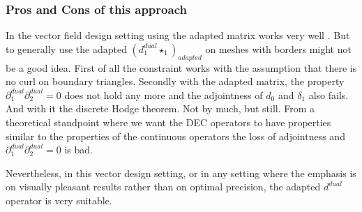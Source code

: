 
\subsubsection{ Pros and Cons of this approach} In the vector field design setting using the adapted matrix works very well . But to generally use the adapted $(d_1^{dual} \star_1)_{adapted}$ on meshes with borders might not be a good idea. First of all the constraint works with the assumption that there is no curl on boundary triangles. Secondly  with the adapted matrix, the property $\partial^{dual}_1\partial^{dual}_2 = 0$ does not hold any more and the adjointness of $d_0$ and $\delta_1$ also fails. And with it the discrete Hodge theorem. Not by much, but still. 
From a theoretical standpoint where we want the DEC operators to have properties similar to the properties of the continuous operators the loss of adjointness and $\partial^{dual}_1\partial^{dual}_2 = 0$ is bad.

Nevertheless, in this vector design setting, or in any setting where the emphasis is on visually pleasant results rather than on optimal precision, the adapted $d^{dual}$ operator is very suitable.